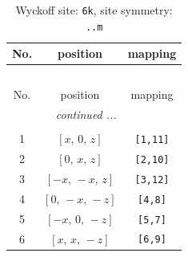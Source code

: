 \documentclass[fleqn,8pt]{jsarticle}
\begin{document}
\renewcommand{\arraystretch}{1.2}
\begin{longtable}{ccc}
\caption{Wyckoff site: {\tt 6k}, site symmetry: {\tt ..m}}
 \\
 \hline \hline
No. & position & mapping \\ \hline \endfirsthead

\multicolumn{2}{l}{\tablename\ \thetable{}} \\
 \hline \hline
No. & position & mapping \\ \hline \endhead

 \hline \hline
\multicolumn{2}{r}{\footnotesize\it continued ...} \\ \endfoot

 \hline \hline
\multicolumn{2}{r}{} \\ \endlastfoot

1 & $\left[ x,\, 0,\, z \right]$ & {\tt [1,11]} \\ \hline
2 & $\left[ 0,\, x,\, z \right]$ & {\tt [2,10]} \\ \hline
3 & $\left[ - x,\, - x,\, z \right]$ & {\tt [3,12]} \\ \hline
4 & $\left[ 0,\, - x,\, - z \right]$ & {\tt [4,8]} \\ \hline
5 & $\left[ - x,\, 0,\, - z \right]$ & {\tt [5,7]} \\ \hline
6 & $\left[ x,\, x,\, - z \right]$ & {\tt [6,9]} \\
\end{longtable}
\renewcommand{\arraystretch}{1.2}
\end{document}
